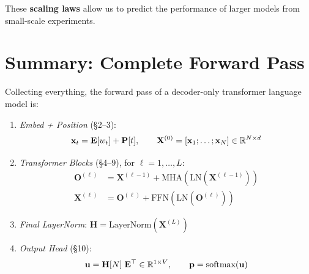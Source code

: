 \documentclass[main.tex]{subfiles}
\begin{document}
These \textbf{scaling laws} allow us to predict the performance of larger models from small-scale experiments.

\needspace{0.33\textheight}
\section{Summary: Complete Forward Pass}

Collecting everything, the forward pass of a decoder-only transformer language model is:

\begin{enumerate}
\item \textit{Embed + Position} (\S2--3):
$$\mathbf{x}_t = \mathbf{E}[w_t] + \mathbf{P}[t], \qquad \mathbf{X}^{(0)} = [\mathbf{x}_1; \ldots; \mathbf{x}_N] \in \mathbb{R}^{N \times d}$$

\item \textit{Transformer Blocks} (\S4--9), for $\ell = 1, \ldots, L$:
\begin{align}
\mathbf{O}^{(\ell)} &= \mathbf{X}^{(\ell-1)} + \text{MHA}\!\left(\text{LN}\!\left(\mathbf{X}^{(\ell-1)}\right)\right) \\[4pt]
\mathbf{X}^{(\ell)} &= \mathbf{O}^{(\ell)} + \text{FFN}\!\left(\text{LN}\!\left(\mathbf{O}^{(\ell)}\right)\right)
\end{align}

\item \textit{Final LayerNorm}: $\mathbf{H} = \text{LayerNorm}(\mathbf{X}^{(L)})$

\item \textit{Output Head} (\S10):
$$\mathbf{u} = \mathbf{H}[N]\; \mathbf{E}^\top \in \mathbb{R}^{1 \times V}, \qquad \mathbf{p} = \text{softmax}(\mathbf{u})$$
\end{enumerate}
\end{document}
